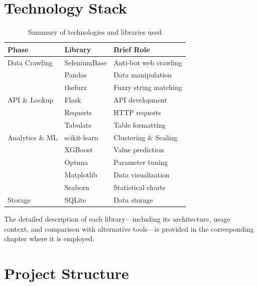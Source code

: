 \documentclass[a4paper,12pt]{report}
\begin{document}
\section{Technology Stack}

\begin{table}[H]
\centering
\caption{Summary of technologies and libraries used}
\label{tab:tech_stack}
\begin{tabularx}{\textwidth}{l l X}
\toprule
\textbf{Phase} & \textbf{Library} & \textbf{Brief Role} \\
\midrule
Data Crawling  & SeleniumBase & Anti-bot web crawling \\
               & Pandas       & Data manipulation \\
               & thefuzz      & Fuzzy string matching \\
\midrule
API \& Lookup  & Flask        & API development \\
               & Requests     & HTTP requests \\
               & Tabulate     & Table formatting \\
\midrule
Analytics \& ML & scikit-learn & Clustering \& Scaling \\
               & XGBoost      & Value prediction \\
               & Optuna       & Parameter tuning \\
               & Matplotlib   & Data visualization \\
               & Seaborn      & Statistical charts \\
\midrule
Storage        & SQLite       & Data storage \\
\bottomrule
\end{tabularx}
\end{table}

The detailed description of each library---including its architecture, usage context, and comparison with alternative tools---is provided in the corresponding chapter where it is employed.

\section{Project Structure}
\end{document}
